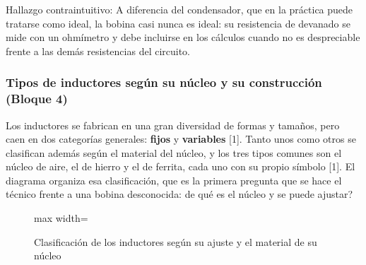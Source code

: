 \documentclass[11pt,letterpaper]{article}
\begin{document}
\begin{nota}{Hallazgo contraintuitivo:}
A diferencia del condensador, que en la práctica puede tratarse como ideal, la bobina casi nunca es ideal: su resistencia de devanado se mide con un ohmímetro y debe incluirse en los cálculos cuando no es despreciable frente a las demás resistencias del circuito.
\end{nota}

\subsubsection{Tipos de inductores según su núcleo y su construcción (Bloque 4)}

Los inductores se fabrican en una gran diversidad de formas y tamaños, pero caen en dos categorías generales: \textbf{fijos} y \textbf{variables} [1]. Tanto unos como otros se clasifican además según el material del núcleo, y los tres tipos comunes son el núcleo de aire, el de hierro y el de ferrita, cada uno con su propio símbolo [1]. El diagrama organiza esa clasificación, que es la primera pregunta que se hace el técnico frente a una bobina desconocida: \textquestiondown{}de qué es el núcleo y se puede ajustar?

\begin{figure}[H]
  \centering
  \begin{adjustbox}{max width=\linewidth}
  \end{adjustbox}
  \caption{Clasificación de los inductores según su ajuste y el material de su núcleo}
\end{figure}
\end{document}

